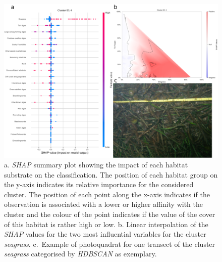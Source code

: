 \begin{figure}
\hypertarget{fig:chap2figS24}{%
\centering
\includegraphics{03-Chapitre2/figures/supplementary/05-explanation_shap_pq_cluster_4.png}
\caption{a. \emph{SHAP} summary plot showing the impact of each habitat
substrate on the classification. The position of each habitat group on
the y-axis indicates its relative importance for the considered cluster.
The position of each point along the x-axis indicates if the observation
is associated with a lower or higher affinity with the cluster and the
colour of the point indicates if the value of the cover of this habitat
is rather high or low. b. Linear interpolation of the \emph{SHAP} values
for the two most influential variables for the cluster \emph{seagrass}.
c.~Example of photoquadrat for one transect of the cluster
\emph{seagrass} categorised by \emph{HDBSCAN} as
exemplary.}\label{fig:chap2figS24}
}
\end{figure}

